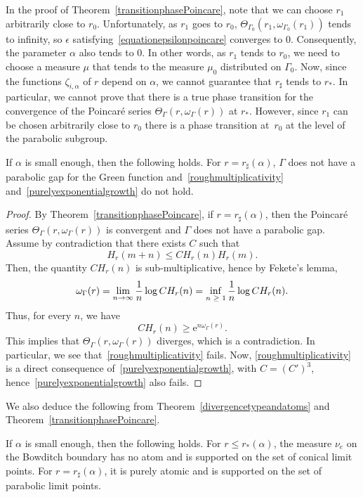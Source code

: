 \documentclass[AHL,Unicode,longabstracts]{cedram}
\newcommand{\rme}{\mathrm{e}}
\let\oldge\ge
\renewcommand{\ge}{\mathchoice{\oldge}{\oldge}{\,\oldge\,}{\,\oldge\,}}
\renewcommand*{\to}{\mathchoice{\longrightarrow}{\rightarrow}{\rightarrow}{\rightarrow}}
\begin{document}
\begin{rema}\label{remarkchoiceofr1}
In the proof of Theorem~\ref{transitionphasePoincare}, note that we can choose $r_1$ arbitrarily close to $r_0$. Unfortunately, as $r_1$ goes to $r_0$, $\Theta_{\Gamma_0}(r_1,\omega_{\Gamma_0}(r_1))$ tends to infinity, so $\epsilon$ satisfying~\eqref{equationepsilonpoincare} converges to 0. Consequently, the parameter $\alpha$ also tends to 0. In other words, as $r_1$ tends to $r_0$, we need to choose a measure $\mu$ that tends to the measure $\mu_0$ distributed on $\Gamma_0$. Now, since the functions $\zeta_{i,\alpha}$ of $r$ depend on $\alpha$, we cannot guarantee that $r_{\sharp}$ tends to $r_*$. In particular, we cannot prove that there is a true phase transition for the convergence of the Poincaré series $\Theta_\Gamma(r,\omega_\Gamma(r))$ at $r_*$. However, since $r_1$ can be chosen arbitrarily close to $r_0$ there is a phase transition at~$r_0$ at the level of the parabolic subgroup.
\end{rema}

\begin{coro}\label{corosubmultiplicativityfails}
If $\alpha$ is small enough, then the following holds. For $r=r_\sharp(\alpha)$, $\Gamma$ does not have a parabolic gap for the Green function and~\eqref{roughmultiplicativity} and~\eqref{purelyexponentialgrowth} do not hold.
\end{coro}


\begin{proof}
By Theorem~\ref{transitionphasePoincare}, if $r=r_\sharp(\alpha)$, then the Poincaré series $\Theta_\Gamma(r,\omega_\Gamma(r))$ is convergent and $\Gamma$ does not have a parabolic gap. Assume by contradiction that there exists $C$ such that
\[
H_r(m+n)\leq C H_r(n)H_r(m).
\]
Then, the quantity $CH_r(n)$ is sub-multiplicative, hence by Fekete's lemma,
\[
\omega_\Gamma(r)=\lim_{n\to\infty} \frac{1}{n}\log CH_r(n)=\inf_{n\ge 1} \frac{1}{n}\log CH_r(n).
\]
Thus, for every $n$, we have
\[
CH_r(n)\geq \rme^{n\omega_\Gamma(r)}.
\]
This implies that $\Theta_\Gamma(r,\omega_\Gamma(r))$ diverges, which is a contradiction. In particular, we see that~\eqref{roughmultiplicativity} fails. Now, \eqref{roughmultiplicativity} is a direct consequence of~\eqref{purelyexponentialgrowth}, with $C=(C')^3$, hence~\eqref{purelyexponentialgrowth} also fails.
\end{proof}

We also deduce the following from Theorem~\ref{divergencetypeandatoms} and Theorem~\ref{transitionphasePoincare}.
\begin{coro}\label{transitionphasePattersonSullivan}
If $\alpha$ is small enough, then the following holds. For $r\leq r_*(\alpha)$, the measure $\nu_e$ on the Bowditch boundary has no atom and is supported on the set of conical limit points. For $r=r_\sharp(\alpha)$, it is purely atomic and is supported on the set of parabolic limit points.
\end{coro}
\end{document}
